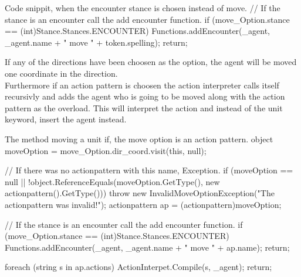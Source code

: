 \begin{source}{Code snippit, when the encounter stance is chosen instead of move.}{}
// If the stance is an encounter call the add encounter function.
if (move_Option.stance == (int)Stance.Stances.ENCOUNTER)
	{
		Functions.addEncounter(_agent, _agent.name + " move " + token.spelling);
		return;
	}
\end{source}

If any of the directions have been choosen as the option, the agent will be moved one coordinate in the direction.\\
Furthermore if an action pattern is choosen the action interpreter calls itself recursivly and adds the agent who is going to be moved along with the action pattern as the overload. This will interpret the action and instead of the unit keyword, insert the agent instead.\\

\begin{source}{The method moving a unit if, the move option is an action pattern.}{}
object moveOption = move_Option.dir_coord.visit(this, null);

// If there was no actionpattern with this name, Exception.
if (moveOption == null || !object.ReferenceEquals(moveOption.GetType(), new actionpattern().GetType()))
	{
		throw new InvalidMoveOptionException("The actionpattern was invalid!");
	}
actionpattern ap = (actionpattern)moveOption;

// If the stance is an encounter call the add encounter function.
if (move_Option.stance == (int)Stance.Stances.ENCOUNTER)
	{
		Functions.addEncounter(_agent, _agent.name + " move " + ap.name);
		return;
	}

foreach (string s in ap.actions)
	{
		ActionInterpet.Compile(s, _agent);
	}
return;
\end{source}
